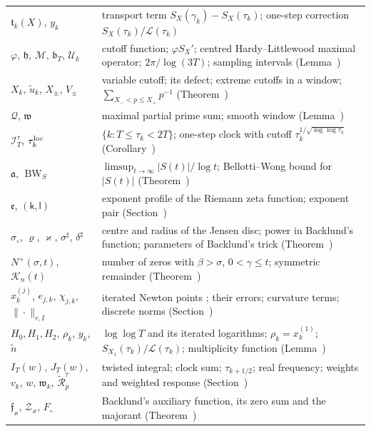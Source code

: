 \documentclass[preprint,12pt]{elsarticle}
\makeatletter
\let\CG@origref\ref
\let\CG@origeqref\eqref
\newcommand{\CG@gettip}[1]{\@ifundefined{CGTip@#1}{Reference: #1}{\csname CGTip@#1\endcsname}}
\DeclareRobustCommand{\CGref}[1]{\pdftooltip{\CG@origref{#1}}{\CG@gettip{#1}}}
\DeclareRobustCommand{\CGeqref}[1]{\pdftooltip{\CG@origeqref{#1}}{\CG@gettip{#1}}}
\numberwithin{equation}{section}
\theoremstyle{plain}
\theoremstyle{definition}
\theoremstyle{remark}
\newcommand{\lL}{\mathcal L}
\newcommand{\BWS}{\operatorname{BW}_S}
\makeatother
\begin{document}
\begin{center}
\begin{longtable}{p{}p{}}
$\mathfrak t_k(X)$, $y_k$ & transport term $S_X(\gamma_k)-S_X(\tau_k)$; one-step correction $S_X(\tau_k)/\lL(\tau_k)$\\
$\varphi$, $\mathfrak h$, $\mathcal M$, $\mathfrak b_T$, $\mathcal U_k$ & cutoff function; $\varphi S_X'$; centred Hardy--Littlewood maximal operator; $2\pi/\log(3T)$; sampling intervals (Lemma~\CGref{lem:transport})\\
$X_k$, $\tilde u_k$, $X_\pm$, $V_\pm$ & variable cutoff; its defect; extreme cutoffs in a window; $\sum_{X_-<p\le X_+}p^{-1}$ (Theorem~\CGref{thm:variable_cutoff})\\
$\mathcal Q$, $\mathfrak w$ & maximal partial prime sum; smooth window (Lemma~\CGref{lem:maximal_primes})\\
$\mathcal I_T^\tau$, $\tau_k^{\rm loc}$ & $\{k:T\le\tau_k<2T\}$; one-step clock with cutoff $\tau_k^{1/\sqrt{\log\log\tau_k}}$ (Corollary~\CGref{cor:local_clock})\\
$\mathfrak a$, $\BWS$ & $\limsup_{t\to\infty}|S(t)|/\log t$; Bellotti--Wong bound for $|S(t)|$ (Theorem~\CGref{thm:known_BW})\\
$\mathfrak e$, $(\mathsf k,\mathsf l)$ & exponent profile of the Riemann zeta function; exponent pair (Section~\CGref{sec:envelope})\\
$\sigma_\circ$, $\varrho$, $\varkappa$, $\sigma^\sharp$, $\delta^\sharp$ & centre and radius of the Jensen disc; power in Backlund's function; parameters of Backlund's trick (Theorem~\CGref{thm:known_backlund})\\
$N^+(\sigma,t)$, $\mathcal K_n(t)$ & number of zeros with $\beta>\sigma$, $0<\gamma\le t$; symmetric remainder (Theorem~\CGref{thm:landau_line})\\
$x^{(j)}_k$, $e_{j,k}$, $\chi_{j,k}$, $\|\cdot\|_{r,I}$ & iterated Newton points \CGeqref{eq:newton_iteration}; their errors; curvature terms; discrete norms (Section~\CGref{sec:iteration})\\
$H_0,H_1,H_2$, $\rho_k$, $y_k$, $\tilde n$ & $\log\log T$ and its iterated logarithms; $\rho_k=x^{(1)}_k$; $S_{X_1}(\tau_k)/\lL(\tau_k)$; multiplicity function (Lemma~\CGref{lem:multiplicity})\\
$I_T(w)$, $J_T(w)$, $v_k$, $w$, $\mathfrak w_k$, $\widetilde{\mathcal R}^\tau_p$ & twisted integral; clock sum; $\tau_{k+1/2}$; real frequency; weights and weighted response (Section~\CGref{subsec:twist})\\
$\mathfrak f_\varkappa$, $\mathcal Z_\varkappa$, $F_\circ$ & Backlund's auxiliary function, its zero sum and the majorant (Theorem~\CGref{thm:known_backlund})\\
\end{longtable}
\end{center}
\end{document}
